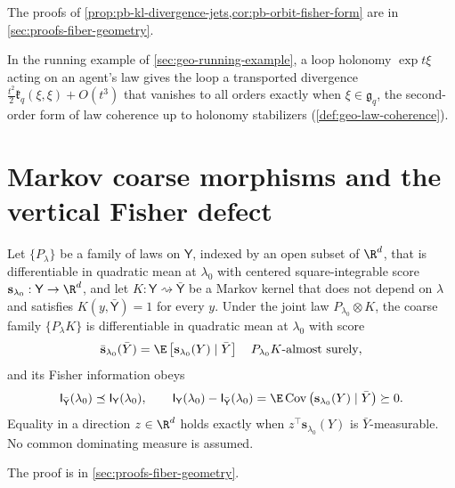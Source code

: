 The proofs of \cref{prop:pb-kl-divergence-jets,cor:pb-orbit-fisher-form} are in
\cref{sec:proofs-fiber-geometry}.

In the running example of \cref{sec:geo-running-example}, a loop holonomy $\exp t\xi$
acting on an agent's law gives the loop a transported divergence
$\tfrac{t^2}{2}\mathfrak k_q(\xi,\xi)+O(t^3)$ that vanishes to all orders exactly when
$\xi\in\mathfrak g_q$, the second-order form of law coherence up to holonomy stabilizers
(\cref{def:geo-law-coherence}).

\section{Markov coarse morphisms and the vertical Fisher defect}
\label{sec:pb-fisher-defect}
\label{sec:cg-fisher-contraction}

Let $\{P_\lambda\}$ be a family of laws on $\mathsf Y$, indexed by an open subset of
$\R^d$, that is differentiable in quadratic mean at $\lambda_0$ with centered
square-integrable score $\mathbf s_{\lambda_0}:\mathsf Y\to\R^d$, and let
$K:\mathsf Y\rightsquigarrow\bar{\mathsf Y}$ be a Markov kernel that does not depend on
$\lambda$ and satisfies $K(y,\bar{\mathsf Y})=1$ for every $y$.  Under the joint law
$P_{\lambda_0}\otimes K$, the coarse family $\{P_\lambda K\}$ is differentiable in
quadratic mean at $\lambda_0$ with score
\begin{equation}
\bar{\mathbf s}_{\lambda_0}(\bar Y)
=\E\left[\mathbf s_{\lambda_0}(Y)\mid\bar Y\right]
\quad P_{\lambda_0}K\text{-almost surely},
\label{eq:cg-score-projection}
\end{equation}
and its Fisher information obeys
\begin{equation}
\mathsf I_{\bar{\mathsf Y}}(\lambda_0)\preceq\mathsf I_{\mathsf Y}(\lambda_0),
\qquad
\mathsf I_{\mathsf Y}(\lambda_0)-\mathsf I_{\bar{\mathsf Y}}(\lambda_0)
=\E\operatorname{Cov}\left(\mathbf s_{\lambda_0}(Y)\mid\bar Y\right)\succeq0.
\label{eq:cg-fisher-loss}
\end{equation}
Equality in a direction $z\in\R^d$ holds exactly when $z^\top\mathbf s_{\lambda_0}(Y)$
is $\bar Y$-measurable.  No common dominating measure is assumed.

The proof is in \cref{sec:proofs-fiber-geometry}.

